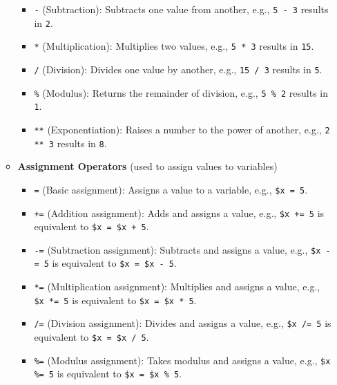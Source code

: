 \documentclass{report}
\begin{document}
\begin{itemize}
\begin{itemize}
\begin{itemize}
                        \item \texttt{-} (Subtraction): Subtracts one value from another, e.g., \texttt{5 - 3} results in \texttt{2}.
                        \item \texttt{*} (Multiplication): Multiplies two values, e.g., \texttt{5 * 3} results in \texttt{15}.
                        \item \texttt{/} (Division): Divides one value by another, e.g., \texttt{15 / 3} results in \texttt{5}.
                        \item \texttt{\%} (Modulus): Returns the remainder of division, e.g., \texttt{5 \% 2} results in \texttt{1}.
                        \item \texttt{**} (Exponentiation): Raises a number to the power of another, e.g., \texttt{2 ** 3} results in \texttt{8}.
                    \end{itemize}

                \item \textbf{Assignment Operators} (used to assign values to variables)
                    \begin{itemize}
                        \item \texttt{=} (Basic assignment): Assigns a value to a variable, e.g., \texttt{\$x = 5}.
                        \item \texttt{+=} (Addition assignment): Adds and assigns a value, e.g., \texttt{\$x += 5} is equivalent to \texttt{\$x = \$x + 5}.
                        \item \texttt{-=} (Subtraction assignment): Subtracts and assigns a value, e.g., \texttt{\$x -= 5} is equivalent to \texttt{\$x = \$x - 5}.
                        \item \texttt{*=} (Multiplication assignment): Multiplies and assigns a value, e.g., \texttt{\$x *= 5} is equivalent to \texttt{\$x = \$x * 5}.
                        \item \texttt{/=} (Division assignment): Divides and assigns a value, e.g., \texttt{\$x /= 5} is equivalent to \texttt{\$x = \$x / 5}.
                        \item \texttt{\%=} (Modulus assignment): Takes modulus and assigns a value, e.g., \texttt{\$x \%= 5} is equivalent to \texttt{\$x = \$x \% 5}.
                    \end{itemize}


\end{itemize}
\end{itemize}
\end{document}
